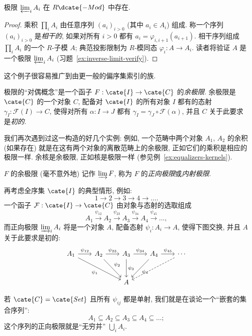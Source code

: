 \begin{claim}\label{claim:inverse-limit-exists}
极限 $\varprojlim_i A_i$ 在 $R\dcate{-Mod}$ 中存在.
\end{claim}

\begin{proof}
乘积 $\prod_i A_i$ 由任意序列 $(a_i)_{i>0}$ (其中 $a_i\in A_i$) 组成. 称一个序列 $(a_i)_{i>0}$ 是\emph{相干的}, 如果对所有 $i>0$ 都有 $a_i=\varphi_{i,i+1}(a_{i+1})$. 相干序列组成 $\prod_i A_i$ 的一个 $R$-子模 $A$; 典范投影限制为 $R$-模同态 $\varphi_i:A\to A_i$. 读者将验证 $A$ 是一个极限 $\varprojlim_i A_i$ (习题~\ref{ex:inverse-limit-verify}).
\end{proof}

这个例子很容易推广到由更一般的偏序集索引的族.

极限的``对偶概念''是一个函子 $F:\cate{I}\to\cate{C}$ 的\emph{余极限}. 余极限是 $\cate{C}$ 的一个对象 $C$, 配备对 $\cate{I}$ 的所有对象 $I$ 都有的态射 $\gamma_I:\mathcal{F}(I)\to C$, 使得对所有 $\alpha:I\to J$ 都有 $\gamma_I=\gamma_J\circ\mathcal{F}(\alpha)$, 并且 $C$ 关于此要求是\emph{初的}.

我们再次遇到过这一构造的好几个实例: 例如, 一个范畴中两个对象 $A_1$, $A_2$ 的余积 (如果存在) 就是在这有两个对象的离散范畴上的余极限, 正如它们的乘积是相应的极限一样. 余核是余极限, 正如核是极限一样 (参见例~\ref{ex:equalizers-kernels}).

$F$ 的余极限 (毫不意外地) 记作 $\varinjlim F$, 称为 $F$ 的\emph{正向极限}或\emph{内射极限}.

再考虑全序集 $\cate{I}$ 的典型情形, 例如:
\[
1\longrightarrow 2\longrightarrow 3\longrightarrow 4\longrightarrow\dots.
\]
一个函子 $\mathcal{F}:\cate{I}\to\cate{C}$ 由对象与态射的选取组成
\[
A_1\xrightarrow{\psi_{12}}A_2\xrightarrow{\psi_{23}}A_3\xrightarrow{\psi_{34}}A_4\xrightarrow{\psi_{45}}\dots,
\]
而正向极限 $\varinjlim_i A_i$ 将是一个对象 $A$, 配备态射 $\psi_i:A_i\to A$, 使得下图交换, 并且 $A$ 关于此要求是初的:
\[
\begin{tikzcd}[column sep=2em,row sep=large]
A_1 \ar[r,"\psi_{12}"] \ar[drr,"\psi_1"'] & A_2 \ar[r,"\psi_{23}"] \ar[dr,"\psi_2"] & A_3 \ar[r,"\psi_{34}"] \ar[d,"\psi_3"] & A_4 \ar[r,"\psi_{45}"] \ar[dl,"\psi_4"] & \cdots \ar[dll,dashed] \\
& & A & &
\end{tikzcd}
\]

\begin{example}\label{ex:direct-limit-union}
若 $\cate{C}=\cate{Set}$ 且所有 $\psi_{ij}$ 都是单射, 我们就是在谈论一个``嵌套的集合序列'':
\[
A_1\subseteq A_2\subseteq A_3\subseteq A_4\subseteq\dots;
\]
这个序列的正向极限就是``无穷并'' $\bigcup_i A_i$.
\end{example}

